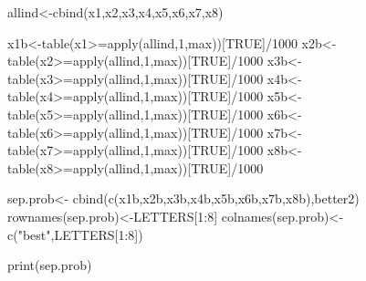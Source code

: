 \documentclass[
]{book}
\newenvironment{Shaded}{\begin{snugshade}}{\end{snugshade}}
\newcommand{\DecValTok}[1]{\textcolor[rgb]{0.00,0.00,0.81}{#1}}
\newcommand{\FunctionTok}[1]{\textcolor[rgb]{0.00,0.00,0.00}{#1}}
\newcommand{\NormalTok}[1]{#1}
\newcommand{\OtherTok}[1]{\textcolor[rgb]{0.56,0.35,0.01}{#1}}
\newcommand{\SpecialCharTok}[1]{\textcolor[rgb]{0.00,0.00,0.00}{#1}}
\newcommand{\StringTok}[1]{\textcolor[rgb]{0.31,0.60,0.02}{#1}}
\theoremstyle{definition}
\theoremstyle{definition}
\theoremstyle{definition}
\theoremstyle{definition}
\theoremstyle{remark}
\begin{document}
\begin{Shaded}
\begin{Highlighting}[]
\NormalTok{ allind}\OtherTok{\textless{}{-}}\FunctionTok{cbind}\NormalTok{(x1,x2,x3,x4,x5,x6,x7,x8)}

\NormalTok{  x1b}\OtherTok{\textless{}{-}}\FunctionTok{table}\NormalTok{(x1}\SpecialCharTok{\textgreater{}=}\FunctionTok{apply}\NormalTok{(allind,}\DecValTok{1}\NormalTok{,max))[}\StringTok{\textquotesingle{}TRUE\textquotesingle{}}\NormalTok{]}\SpecialCharTok{/}\DecValTok{1000}
\NormalTok{  x2b}\OtherTok{\textless{}{-}}\FunctionTok{table}\NormalTok{(x2}\SpecialCharTok{\textgreater{}=}\FunctionTok{apply}\NormalTok{(allind,}\DecValTok{1}\NormalTok{,max))[}\StringTok{\textquotesingle{}TRUE\textquotesingle{}}\NormalTok{]}\SpecialCharTok{/}\DecValTok{1000}
\NormalTok{  x3b}\OtherTok{\textless{}{-}}\FunctionTok{table}\NormalTok{(x3}\SpecialCharTok{\textgreater{}=}\FunctionTok{apply}\NormalTok{(allind,}\DecValTok{1}\NormalTok{,max))[}\StringTok{\textquotesingle{}TRUE\textquotesingle{}}\NormalTok{]}\SpecialCharTok{/}\DecValTok{1000}
\NormalTok{  x4b}\OtherTok{\textless{}{-}}\FunctionTok{table}\NormalTok{(x4}\SpecialCharTok{\textgreater{}=}\FunctionTok{apply}\NormalTok{(allind,}\DecValTok{1}\NormalTok{,max))[}\StringTok{\textquotesingle{}TRUE\textquotesingle{}}\NormalTok{]}\SpecialCharTok{/}\DecValTok{1000}
\NormalTok{  x5b}\OtherTok{\textless{}{-}}\FunctionTok{table}\NormalTok{(x5}\SpecialCharTok{\textgreater{}=}\FunctionTok{apply}\NormalTok{(allind,}\DecValTok{1}\NormalTok{,max))[}\StringTok{\textquotesingle{}TRUE\textquotesingle{}}\NormalTok{]}\SpecialCharTok{/}\DecValTok{1000}
\NormalTok{  x6b}\OtherTok{\textless{}{-}}\FunctionTok{table}\NormalTok{(x6}\SpecialCharTok{\textgreater{}=}\FunctionTok{apply}\NormalTok{(allind,}\DecValTok{1}\NormalTok{,max))[}\StringTok{\textquotesingle{}TRUE\textquotesingle{}}\NormalTok{]}\SpecialCharTok{/}\DecValTok{1000}
\NormalTok{  x7b}\OtherTok{\textless{}{-}}\FunctionTok{table}\NormalTok{(x7}\SpecialCharTok{\textgreater{}=}\FunctionTok{apply}\NormalTok{(allind,}\DecValTok{1}\NormalTok{,max))[}\StringTok{\textquotesingle{}TRUE\textquotesingle{}}\NormalTok{]}\SpecialCharTok{/}\DecValTok{1000}
\NormalTok{  x8b}\OtherTok{\textless{}{-}}\FunctionTok{table}\NormalTok{(x8}\SpecialCharTok{\textgreater{}=}\FunctionTok{apply}\NormalTok{(allind,}\DecValTok{1}\NormalTok{,max))[}\StringTok{\textquotesingle{}TRUE\textquotesingle{}}\NormalTok{]}\SpecialCharTok{/}\DecValTok{1000}

\NormalTok{  sep.prob}\OtherTok{\textless{}{-}} \FunctionTok{cbind}\NormalTok{(}\FunctionTok{c}\NormalTok{(x1b,x2b,x3b,x4b,x5b,x6b,x7b,x8b),better2)}
  \FunctionTok{rownames}\NormalTok{(sep.prob)}\OtherTok{\textless{}{-}}\NormalTok{LETTERS[}\DecValTok{1}\SpecialCharTok{:}\DecValTok{8}\NormalTok{]}
    \FunctionTok{colnames}\NormalTok{(sep.prob)}\OtherTok{\textless{}{-}}\FunctionTok{c}\NormalTok{(}\StringTok{"best"}\NormalTok{,LETTERS[}\DecValTok{1}\SpecialCharTok{:}\DecValTok{8}\NormalTok{])}
    
    \FunctionTok{print}\NormalTok{(sep.prob)}
\end{Highlighting}
\end{Shaded}
\end{document}
